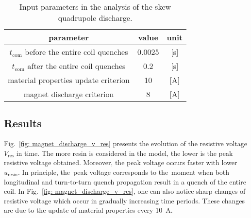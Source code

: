 \begin{table}[H]
    \caption{Input parameters in the analysis of the skew quadrupole discharge.} 
    \vspace{-1.em} 
    \fontsize{10}{10}
    \selectfont 
    \renewcommand{\arraystretch}{1.5}
    \begin{center}
        \begin{tabular}{ ccc }  
        \hline
        parameter & value & unit \\
        \hline
        $t_\text{com}$ before the entire coil quenches & 0.0025 & [s] \\
        $t_\text{com}$ after the entire coil quenches & 0.2 & [s] \\ 
        material properties update criterion & 10 & [A] \\ 
        magnet discharge criterion & 8 & [A] \\
        \hline 
        \end{tabular}
    \end{center}  
     \label{table: skew_quad_discharge_input_params} 
 \end{table}

\subsection{Results}

Fig.~\ref{fig: magnet_discharge_v_res} presents the evolution of the resistive voltage $V_\text{res}$ in time. The more resin is considered in the model, the lower is the peak resistive voltage obtained. Moreover, the peak voltage occurs faster with lower $u_\text{resin}$. In principle, the~peak voltage corresponds to the~moment when both longitudinal and turn-to-turn quench propagation result in a quench of the entire coil. In Fig.~\ref{fig: magnet_discharge_v_res}, one can also notice sharp changes of resistive voltage which occur in gradually increasing time periods. These changes are due to the update of material properties every 10~A.

